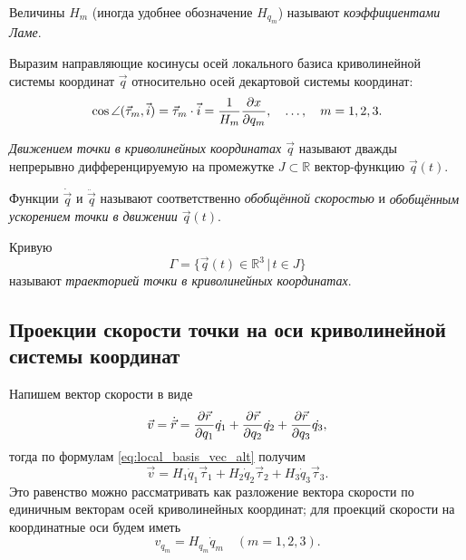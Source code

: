 \begin{definition}
  Величины $H_m$ (иногда удобнее обозначение $H_{q_m}$) называют
  \textit{коэффициентами Ламе}.
\end{definition}

Выразим направляющие косинусы осей локального базиса криволинейной системы
координат $\vec{q}$ относительно осей декартовой системы координат:
\begin{equation}
  \cos\angle (\vec{\tau}_m, \vec{i}) = \dotprod{\vec{\tau}_m}{\vec{i}} =
    \frac{1}{H_m} \parder[x]{q_m}, \quad \dots, \quad m = 1,2,3.
\end{equation}

\begin{definition}
  \textit{Движением точки в криволинейных координатах $\vec{q}$} называют
  дважды непрерывно дифференцируемую на промежутке $J \subset \mathbb{R}$
  вектор-функцию $\vec{q}(t)$.
\end{definition}

\begin{definition}
  Функции $\dot{\vec{q}}$ и $\ddot{\vec{q}}$ называют соответственно
  \textit{обобщённой скоростью} и \textit{обобщённым ускорением точки в
  движении $\vec{q}(t)$}.
\end{definition}

\begin{definition}
  Кривую
  \begin{equation*}
    \Gamma = \{ \vec{q}(t) \in \mathbb{R}^3 \, | \, t \in J \}
  \end{equation*}
  называют \textit{траекторией точки в криволинейных координатах}.
\end{definition}

\subsection{Проекции скорости точки на оси криволинейной системы координат}

Напишем вектор скорости в виде
\begin{equation}
  \label{eq:velocity_def}
  \vec{v} = \dot{\vec{r}} = \parder[\vec{r}]{q_1} \dot{q_1} +
  \parder[\vec{r}]{q_2} \dot{q_2} + \parder[\vec{r}]{q_3} \dot{q_3},
\end{equation}
тогда по формулам \ref{eq:local_basis_vec_alt} получим
\begin{equation*}
  \vec{v} = H_1 \dot{q}_1 \vec{\tau}_1 + H_2 \dot{q}_2 \vec{\tau}_2 + H_3
  \dot{q}_3 \vec{\tau}_3.
\end{equation*}
Это равенство можно рассматривать как разложение вектора скорости по единичным
векторам осей криволинейных координат; для проекций скорости на координатные
оси будем иметь
\begin{equation}
  \label{eq:velocity_proj}
  v_{q_m} = H_{q_m} \dot{q}_m \quad (m = 1,2,3).
\end{equation}


